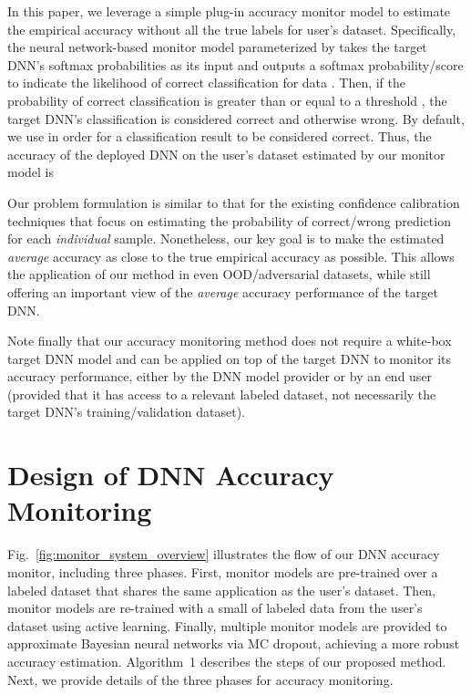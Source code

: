 \documentclass{article}
\begin{document}
In this paper,
we leverage a simple plug-in accuracy monitor model to estimate the  empirical accuracy  without all
the true labels for user's dataset. Specifically,
the neural network-based monitor model   parameterized by  takes the target
DNN's softmax probabilities 
 as its input and outputs
a softmax probability/score  to indicate the likelihood of correct classification for data .
Then, if the probability of correct classification
is greater than or equal to a threshold ,
the target DNN's classification is considered correct and otherwise wrong.
By default,
we use  in order
for a classification result to be considered correct.
Thus, the accuracy of the deployed DNN on the user's dataset estimated by our monitor model
is



Our problem formulation is similar
to that for the existing
confidence calibration techniques \cite{DNN_Uncertainty_PostHoc_Dirichlet_NIPS_2019_kull2019beyond,DNN_Calibration_TemperatureScaling_ICML_2017_calibration_guo_2017}
that focus on estimating the probability
of correct/wrong prediction for each \emph{individual}
sample.
Nonetheless, our key goal is to make the estimated \emph{average} accuracy
 as close to the true  empirical accuracy  as possible.
This allows the application
of our method in even OOD/adversarial datasets, while still offering
an important view of the \emph{average} accuracy performance of
the target DNN.

Note finally that  our accuracy monitoring method does not require
a white-box target DNN model and
can be  applied on top of the target DNN
to monitor its accuracy performance,
either by the DNN model provider
or by an end user (provided that it has access
to a relevant labeled dataset, not necessarily the target DNN's
training/validation dataset). 

\section{Design of DNN Accuracy Monitoring}\label{sec:methodology}

Fig.~\ref{fig:monitor_system_overview} illustrates the flow of
our DNN accuracy monitor, including three phases. First, monitor models
are pre-trained over a labeled dataset that shares the
same application as the user's dataset.
Then, monitor models are re-trained with a small  of labeled data from the user's dataset using active learning. Finally,
multiple monitor models are provided to approximate Bayesian neural networks via MC dropout, achieving a more robust accuracy estimation. Algorithm~1 describes the steps of our proposed method. Next, we provide details of the three phases for accuracy monitoring.
\end{document}
